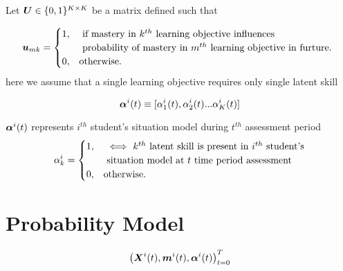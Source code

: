 \begin{definition}
Let $\boldsymbol{U}  \in \{ 0,1 \}^{K \times K}$ be a matrix defined such that

\begin{equation}
  \boldsymbol{u}_{mk}=\begin{cases}
    1, & \text{ if mastery in $ k^{th} $ learning objective influences } \\
    & \text{ probability of mastery in $m^{th}$ learning objective in furture.   }\\
    0, & \text{otherwise.}
  \end{cases}
\end{equation}
here we assume that a single learning objective requires only single latent skill
\end{definition}

\begin{definition}
\begin{equation}
\boldsymbol{\alpha}^{i}(t) \equiv [\alpha^{i}_{1}(t), \alpha^{i}_{2}(t)...\alpha^{i}_{K}(t) ]
\end{equation}

$\boldsymbol{\alpha}^{i}(t)$ represents $i^{th}$ student's situation model during $t^{th}$ assessment period
\begin{equation}
  \alpha^{i}_{k}=\begin{cases}
    1, & \text{ $\iff$ $ k^{th} $ latent skill is present in $i^{th}$ student's} \\
    & \text{  situation model at $t$ time period assessment }\\
    0, & \text{otherwise.}
  \end{cases}
\end{equation}
\end{definition}

\section{Probability Model}
\begin{definition}

\begin{equation}
    \left ( \boldsymbol{X}^{i}(t), \boldsymbol{m}^{i}(t), \boldsymbol{\alpha}^{i}(t) \right )_{t=0}^{T} 
\end{equation}

\end{definition}


